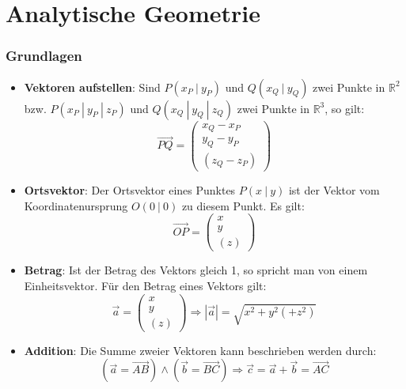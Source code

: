 \newpage
\part{Analytische Geometrie}

\section{Grundlagen}
\begin{itemize}

  \item \textbf{Vektoren aufstellen}:
  Sind $P(x_P~|~y_P)$ und $Q(x_Q~|~y_Q)$ zwei Punkte in $\mathbb{R}^2$
  bzw. $P(x_P~|~y_P~|~z_P)$ und $Q(x_Q~|~y_Q~|~z_Q)$ zwei Punkte in
  $\mathbb{R}^3$, so gilt:
  \begin{equation}
    \overrightarrow{PQ}=\left(
      \begin{array}{c}
        x_Q - x_P \\ y_Q - y_P \\ (z_Q - z_P)
      \end{array}
    \right)
  \end{equation}

  \item \textbf{Ortsvektor}:
  Der Ortsvektor eines Punktes $P(x~|~y)$ ist der Vektor vom
  Koordinatenursprung $O(0~|~0)$ zu diesem Punkt. Es gilt:
  \begin{equation}
    \overrightarrow{OP}=\left(
      \begin{array}{c} x \\ y \\ (z) \end{array}
    \right)
  \end{equation}

  \item \textbf{Betrag}:
  Ist der Betrag des Vektors gleich 1, so spricht man von einem
  Einheitsvektor. Für den Betrag eines Vektors gilt:
  \begin{equation}
    \overrightarrow{a}=
      \left(\begin{array}{c} x \\ y \\ (z) \end{array}\right)
      \Rightarrow \left| \overrightarrow{a} \right|
      = \sqrt{ x^2 + y^2 (+ z^2) }
  \end{equation}

  \item \textbf{Addition}:
  Die Summe zweier Vektoren kann beschrieben werden durch:
  \begin{equation}
    (\overrightarrow{a} = \overrightarrow{AB}) \wedge
    (\overrightarrow{b} = \overrightarrow{BC}) \Rightarrow \overrightarrow{c} = \overrightarrow{a} + \overrightarrow{b} = \overrightarrow{AC}
  \end{equation}

\end{itemize}

